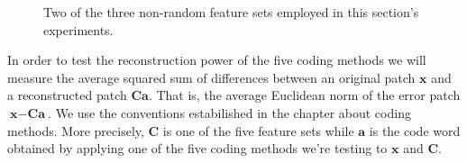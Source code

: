 \documentclass[12pt,a4paper,oneside,english]{UPBThesis}
\begin{document}
\begin{figure}
\centering
{}
\caption{Two of the three non-random feature sets employed in this section's experiments.}
\label{fig:RecSparseFeatureSets}
\end{figure}

In order to test the reconstruction power of the five coding methods we will measure the average squared sum of differences between an original patch $\textbf{x}$ and a reconstructed patch $\textbf{C}\textbf{a}$. That is, the average Euclidean norm of the error patch $\textbf{x} - \textbf{C}\textbf{a}$. We use the conventions estabilished in the chapter about coding methods. More precisely, $\textbf{C}$ is one of the five feature sets while $\textbf{a}$ is the code word obtained by applying one of the five coding methods we're testing to $\textbf{x}$ and $\textbf{C}$.
\end{document}
